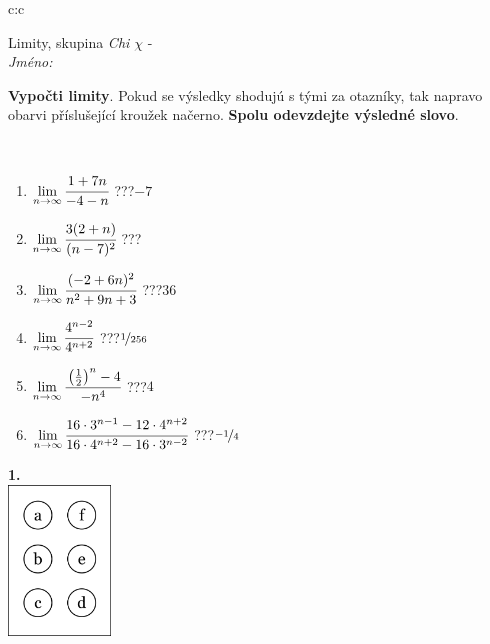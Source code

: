 \documentclass[10pt]{report}
\begin{document}
\begin{tabular}{c:c}
\begin{minipage}[c][104.5mm][t]{0.5\linewidth}
\begin{center}
\vspace{7mm}
{\huge Limity, skupina \textit{Chi $\chi$} -}\\[5mm]
\textit{Jméno:}\phantom{xxxxxxxxxxxxxxxxxxxxxxxxxxxxxxxxxxxxxxxxxxxxxxxxxxxxxxxxxxxxxxxxx}\\[5mm]
\begin{minipage}{0.95\linewidth}
\begin{center}
\textbf{Vypočti limity}. Pokud se výsledky shodujú s tými za otazníky, tak napravo\\obarvi příslušející kroužek načerno. \textbf{Spolu odevzdejte výsledné slovo}.
\end{center}
\end{minipage}
\\[1mm]
\begin{minipage}{0.79\linewidth}
\begin{center}
\begin{varwidth}{\linewidth}
\begin{enumerate}
\normalsize
\item $\lim\limits_{n\to\infty}\cfrac{1+7n}{-4-n}$\quad \dotfill\; ???\;\dotfill \quad $-7$
\item $\lim\limits_{n\to\infty}\cfrac{3(2+n)}{(n-7)^2}$\quad \dotfill\; ???\;\dotfill {}
\item $\lim\limits_{n\to\infty}\cfrac{(-2+6n)^2}{n^2+9n+3}$\quad \dotfill\; ???\;\dotfill \quad $36$
\item $\lim\limits_{n\to\infty}\cfrac{4^{n-2}}{4^{n+2}}$\quad \dotfill\; ???\;\dotfill \quad $\nicefrac{1}{256}$
\item $\lim\limits_{n\to\infty}\cfrac{\left(\frac{1}{2}\right)^n -4}{-n^{4}}$\quad \dotfill\; ???\;\dotfill \quad $4$
\item $\lim\limits_{n\to\infty}\cfrac{16\cdot 3^{n-1}-12\cdot 4^{n+2}}{16\cdot 4^{n+2}-16\cdot 3^{n-2}}$\quad \dotfill\; ???\;\dotfill \quad $\nicefrac{-1}{4}$
\end{enumerate}
\end{varwidth}
\end{center}
\end{minipage}
\begin{minipage}{0.20\linewidth}
\begin{center}
{\Huge\bfseries 1.} \\[2mm]
\includegraphics[height=40mm]{../images/braille.png}

\end{center}
\end{minipage}
\end{center}
\end{minipage}
\end{tabular}
\end{document}
